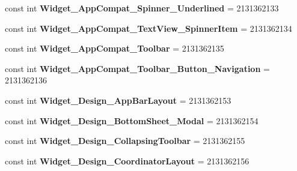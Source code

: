 \begin{DoxyCompactItemize}
const int {\bfseries Widget\+\_\+\+App\+Compat\+\_\+\+Spinner\+\_\+\+Underlined} = 2131362133
\item 
\mbox{\label{class_pinned_app_1_1_droid_1_1_resource_1_1_style_a80e2b8cbfbe826789dfdc4deca2952a4}} 
const int {\bfseries Widget\+\_\+\+App\+Compat\+\_\+\+Text\+View\+\_\+\+Spinner\+Item} = 2131362134
\item 
\mbox{\label{class_pinned_app_1_1_droid_1_1_resource_1_1_style_ad89b693ba1ed59fe44c8ae97e5f52964}} 
const int {\bfseries Widget\+\_\+\+App\+Compat\+\_\+\+Toolbar} = 2131362135
\item 
\mbox{\label{class_pinned_app_1_1_droid_1_1_resource_1_1_style_aad1c08b2e10137ed4fa2dff8e2f0c667}} 
const int {\bfseries Widget\+\_\+\+App\+Compat\+\_\+\+Toolbar\+\_\+\+Button\+\_\+\+Navigation} = 2131362136
\item 
\mbox{\label{class_pinned_app_1_1_droid_1_1_resource_1_1_style_acedc2dda586626bf5c00f050f21c9994}} 
const int {\bfseries Widget\+\_\+\+Design\+\_\+\+App\+Bar\+Layout} = 2131362153
\item 
\mbox{\label{class_pinned_app_1_1_droid_1_1_resource_1_1_style_aa77e11c91c11f4da1675682cc6b98f61}} 
const int {\bfseries Widget\+\_\+\+Design\+\_\+\+Bottom\+Sheet\+\_\+\+Modal} = 2131362154
\item 
\mbox{\label{class_pinned_app_1_1_droid_1_1_resource_1_1_style_ad5e7bfee0e72a0ee7c1f98ffe534e4f5}} 
const int {\bfseries Widget\+\_\+\+Design\+\_\+\+Collapsing\+Toolbar} = 2131362155
\item 
\mbox{\label{class_pinned_app_1_1_droid_1_1_resource_1_1_style_a9d3cb84893a0e33c510bc80155249fed}} 
const int {\bfseries Widget\+\_\+\+Design\+\_\+\+Coordinator\+Layout} = 2131362156
\item 
\mbox{\label{class_pinned_app_1_1_droid_1_1_resource_1_1_style_a82999faa9bcef8f98b9502ea43081b53}} 

\end{DoxyCompactItemize}
